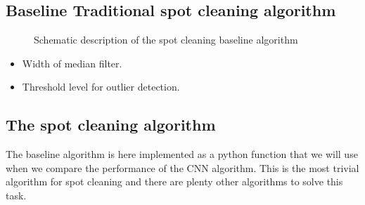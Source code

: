 \documentclass[letterpaper,10pt,english]{sphinxmanual}
\begin{document}
\subsection{Baseline \sphinxhyphen{} Traditional spot cleaning algorithm}
\label{\detokenize{ML4NeutronImageSegmentation:baseline-traditional-spot-cleaning-algorithm}}
\begin{figure}[htbp]
\centering
\capstart

\noindent{}
\caption{Schematic description of the spot cleaning baseline algorithm}\label{\detokenize{ML4NeutronImageSegmentation:id15}}\end{figure}



\begin{itemize}
\item {} 
 Width of median filter.

\item {} 
 Threshold level for outlier detection.

\end{itemize}


\subsection{The spot cleaning algorithm}
\label{\detokenize{ML4NeutronImageSegmentation:the-spot-cleaning-algorithm}}
The baseline algorithm is here implemented as a python function that we will use when we compare the performance of the CNN algorithm. This is the most trivial algorithm for spot cleaning and there are plenty other algorithms to solve this task.

\begin{sphinxVerbatim}[commandchars=\\\{\}]
   \PYG{p}{[}\PYG{p}{]} 
      
        
            
     
\end{sphinxVerbatim}
\end{document}
